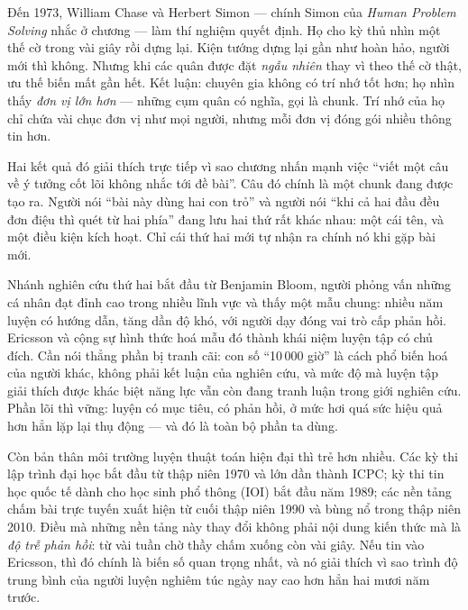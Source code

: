 \documentclass[../../algorithm.tex]{subfiles}
\begin{document}
Đến 1973, William Chase và Herbert Simon --- chính Simon của \emph{Human Problem Solving} nhắc ở chương  --- làm thí nghiệm quyết định. Họ cho kỳ thủ nhìn một thế cờ trong vài giây rồi dựng lại. Kiện tướng dựng lại gần như hoàn hảo, người mới thì không. Nhưng khi các quân được đặt \emph{ngẫu nhiên} thay vì theo thế cờ thật, ưu thế biến mất gần hết. Kết luận: chuyên gia không có trí nhớ tốt hơn; họ nhìn thấy \emph{đơn vị lớn hơn} --- những cụm quân có nghĩa, gọi là chunk. Trí nhớ của họ chỉ chứa vài chục đơn vị như mọi người, nhưng mỗi đơn vị đóng gói nhiều thông tin hơn.

Hai kết quả đó giải thích trực tiếp vì sao chương  nhấn mạnh việc ``viết một câu về ý tưởng cốt lõi không nhắc tới đề bài''. Câu đó chính là một chunk đang được tạo ra. Người nói ``bài này dùng hai con trỏ'' và người nói ``khi cả hai đầu đều đơn điệu thì quét từ hai phía'' đang lưu hai thứ rất khác nhau: một cái tên, và một điều kiện kích hoạt. Chỉ cái thứ hai mới tự nhận ra chính nó khi gặp bài mới.

Nhánh nghiên cứu thứ hai bắt đầu từ Benjamin Bloom, người phỏng vấn những cá nhân đạt đỉnh cao trong nhiều lĩnh vực và thấy một mẫu chung: nhiều năm luyện có hướng dẫn, tăng dần độ khó, với người dạy đóng vai trò cấp phản hồi. Ericsson và cộng sự hình thức hoá mẫu đó thành khái niệm luyện tập có chủ đích\cite{ericsson1993,ericsson2016}. Cần nói thẳng phần bị tranh cãi: con số ``10\,000 giờ'' là cách phổ biến hoá của người khác, không phải kết luận của nghiên cứu, và mức độ mà luyện tập giải thích được khác biệt năng lực vẫn còn đang tranh luận trong giới nghiên cứu. Phần lõi thì vững: luyện có mục tiêu, có phản hồi, ở mức hơi quá sức hiệu quả hơn hẳn lặp lại thụ động --- và đó là toàn bộ phần ta dùng.

Còn bản thân môi trường luyện thuật toán hiện đại thì trẻ hơn nhiều. Các kỳ thi lập trình đại học bắt đầu từ thập niên 1970 và lớn dần thành ICPC; kỳ thi tin học quốc tế dành cho học sinh phổ thông (IOI) bắt đầu năm 1989; các nền tảng chấm bài trực tuyến xuất hiện từ cuối thập niên 1990 và bùng nổ trong thập niên 2010. Điều mà những nền tảng này thay đổi không phải nội dung kiến thức mà là \emph{độ trễ phản hồi}: từ vài tuần chờ thầy chấm xuống còn vài giây. Nếu tin vào Ericsson, thì đó chính là biến số quan trọng nhất, và nó giải thích vì sao trình độ trung bình của người luyện nghiêm túc ngày nay cao hơn hẳn hai mươi năm trước.
\end{document}
